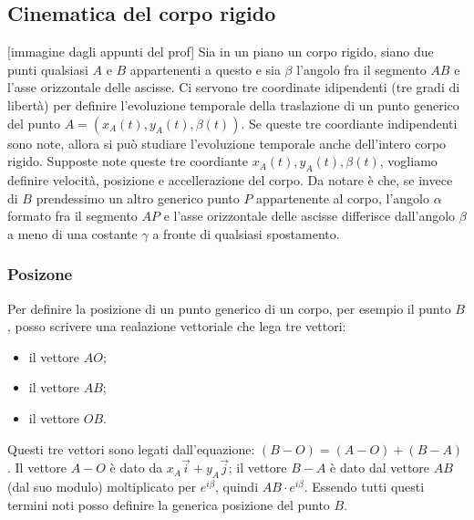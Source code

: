 \subsection{Cinematica del corpo rigido}
[immagine dagli appunti del prof]\newline
Sia in un piano un corpo rigido, siano due punti qualsiasi $A$ e $B$ appartenenti a questo e sia $\beta$ l'angolo fra il segmento $AB$ e l'asse orizzontale delle ascisse.\newline
Ci servono tre coordinate idipendenti (tre gradi di libertà) per definire l'evoluzione temporale della traslazione di un punto generico del punto $A = (x_A(t), y_A(t), \beta(t))$. Se queste tre coordiante indipendenti sono note, allora si può studiare l'evoluzione temporale anche dell'intero corpo rigido.\newline
Supposte note queste tre coordiante $x_A(t), y_A(t), \beta(t)$, vogliamo definire velocità, posizione e accellerazione del corpo.\newline
Da notare è che, se invece di $B$ prendessimo un altro generico punto $P$ appartenente al corpo, l'angolo $\alpha$ formato fra il segmento $AP$ e l'asse orizzontale delle ascisse differisce dall'angolo $\beta$ a meno di una costante $\gamma$ a fronte di qualsiasi spostamento.
\subsubsection{Posizone}
Per definire la posizione di un punto generico di un corpo, per esempio il punto $B$, posso scrivere una realazione vettoriale che lega tre vettori:
\begin{itemize}
    \item il vettore $AO$;
    \item il vettore $AB$;
    \item il vettore $OB$.
\end{itemize}
Questi tre vettori sono legati dall'equazione: $(B-O) = (A-O) + (B-A)$. Il vettore $A-O$ è dato da $x_A \vec{i} + y_A \vec{j}$; il vettore $B-A$ è dato dal vettore $AB$ (dal suo modulo) moltiplicato per $e^{i \beta}$, quindi $AB \cdot e^{i \beta}$. Essendo tutti questi termini noti posso definire la generica posizione del punto $B$.
